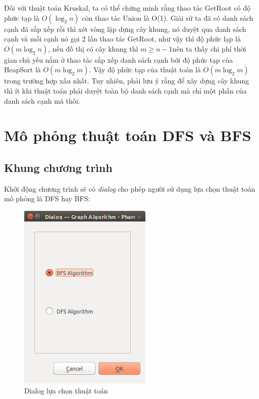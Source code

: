 \documentclass[a4paper,10pt]{article}
\begin{document}
Đối với thuật toán Kruskal, ta có thể chứng minh rằng thao tác GetRoot có độ phức tạp là $O(\log_2{n})$ còn thao tác Union là O(1). Giải sử ta đã có danh sách cạnh đã sắp xếp rồi thì xét vòng lặp dựng cây khung, nó duyệt qua danh sách cạnh và mỗi cạnh nó gọi 2 lần thao tác GetRoot, như vậy thì độ phức lạp là $O(m\log_2 n)$, nếu đồ thị có cây khung thì $m \geq n-1$nên ta thấy chi phí thời gian chủ yếu nằm ở thao tác sắp xếp danh sách cạnh bởi độ phức tạp của HeapSort là $O(m\log_2 m)$. Vậy độ phức tạp của thuật toán là $O(m\log_2 m)$ trong trường hợp xấu nhất. Tuy nhiên, phải lưu ý rằng để xây dựng cây khung thì ít khi thuật toán phải duyệt toàn bộ danh sách cạnh mà chỉ một phần của danh sách cạnh mà thôi.



\section{Mô phỏng thuật toán DFS và BFS}

\subsection{Khung chương trình}
Khởi động chương trình sẽ có \emph{dialog} cho phép người sử dụng lựa chọn thuật toán mô phỏng là DFS hay BFS:
\begin{figure}[h!]
  \centering
  \includegraphics[scale=0.5]{images/pic4.png}
  \caption{Dialog lựa chọn thuật toán}
\end{figure}
\end{document}
